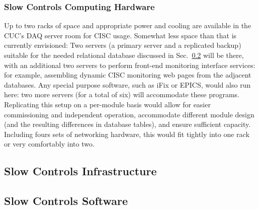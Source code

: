\subsubsection{Slow Controls Computing Hardware}
\label{sec:fdgen-slow-cryo-slow-compute}

Up to two racks of space and appropriate power and cooling are available
in the CUC's DAQ server room for CISC usage.  Somewhat less space than
that is currently envisioned: Two servers (a primary server and a
replicated backup) suitable for the needed relational database discussed
in Sec.~\ref{sec:fdgen-slow-cryo-sw} will be there, with an additional
two servers to perform front-end monitoring interface services: for
example, assembling dynamic CISC monitoring web pages from the adjacent
databases.  Any special purpose software, such as iFix or EPICS, would
also run here: two more servers (for a total of six) will accommodate
these programs.
Replicating this setup on a per-module basis would allow for easier
commissioning and independent operation, accommodate different module
design (and the resulting differences in database tables), and ensure
sufficient capacity.  Including fours sets of networking hardware, this
would fit tightly into one rack or very comfortably into two.




\subsection{Slow Controls Infrastructure}
\label{sec:fdgen-slow-cryo-slow-infra}

\subsection{Slow Controls Software}
\label{sec:fdgen-slow-cryo-sw}

